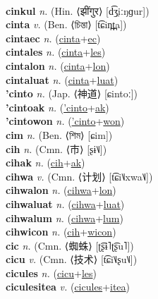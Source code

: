  \label{cinciki} \\
\textbf{cinkul} \textit{n.} (Hin. ⟨झींगुर⟩ [d͡ʒ̤iːŋɡur])
 \label{cinkul} \\
\textbf{cinta} \textit{v.} (Ben. ⟨চিন্তা⟩ [t͡ɕin̪t̪a])
 \label{cinta} \\
\textbf{cintaec} \textit{n.} (\hyperref[cinta]{cinta}+\hyperref[ec]{ec})
 \label{cintaec} \\
\textbf{cintales} \textit{n.} (\hyperref[cinta]{cinta}+\hyperref[les]{les})
 \label{cintales} \\
\textbf{cintalon} \textit{n.} (\hyperref[cinta]{cinta}+\hyperref[lon]{lon})
 \label{cintalon} \\
\textbf{cintaluat} \textit{n.} (\hyperref[cinta]{cinta}+\hyperref[luat]{luat})
 \label{cintaluat} \\
\textbf{'cinto} \textit{n.} (Jap. ⟨神道⟩ [ɕintoː])
 \label{'cinto} \\
\textbf{'cintoak} \textit{n.} (\hyperref['cinto]{'cinto}+\hyperref[ak]{ak})
 \label{'cintoak} \\
\textbf{'cintowon} \textit{n.} (\hyperref['cinto]{'cinto}+\hyperref[won]{won})
 \label{'cintowon} \\
\textbf{cim} \textit{n.} (Ben. ⟨শিম⟩ [ɕim])
 \label{cim} \\
\textbf{cih} \textit{n.} (Cmn. ⟨市⟩ [ʂɨ˥˩])
 \label{cih} \\
\textbf{cihak} \textit{n.} (\hyperref[cih]{cih}+\hyperref[ak]{ak})
 \label{cihak} \\
\textbf{cihwa} \textit{v.} (Cmn. ⟨计划⟩ [t͡ɕi˥˩xwa˥˩])
 \label{cihwa} \\
\textbf{cihwalon} \textit{n.} (\hyperref[cihwa]{cihwa}+\hyperref[lon]{lon})
 \label{cihwalon} \\
\textbf{cihwaluat} \textit{n.} (\hyperref[cihwa]{cihwa}+\hyperref[luat]{luat})
 \label{cihwaluat} \\
\textbf{cihwalum} \textit{n.} (\hyperref[cihwa]{cihwa}+\hyperref[lum]{lum})
 \label{cihwalum} \\
\textbf{cihwicon} \textit{n.} (\hyperref[cih]{cih}+\hyperref[wicon]{wicon})
 \label{cihwicon} \\
\textbf{cic} \textit{n.} (Cmn. ⟨蜘蛛⟩ [ʈ͡ʂɨ˥ʈ͡ʂu˥])
 \label{cic} \\
\textbf{cicu} \textit{v.} (Cmn. ⟨技术⟩ [t͡ɕi˥˩ʂu˥˩])
 \label{cicu} \\
\textbf{cicules} \textit{n.} (\hyperref[cicu]{cicu}+\hyperref[les]{les})
 \label{cicules} \\
\textbf{ciculesitea} \textit{v.} (\hyperref[cicules]{cicules}+\hyperref[itea]{itea})

